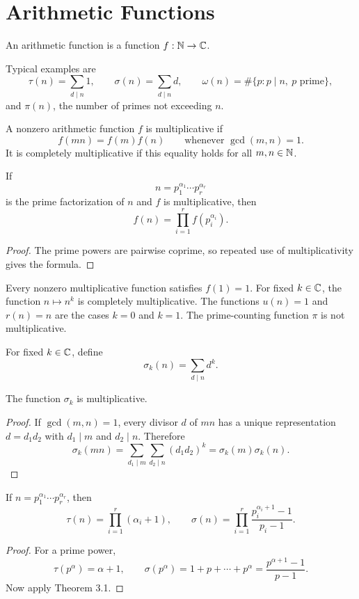 \chapter{Arithmetic Functions}

\begin{de}
An arithmetic function is a function $f:\mathbb{N}\to\mathbb{C}$.
\end{de}
Typical examples are
\[
 \tau(n)=\sum_{d\mid n}1,
 \qquad
 \sigma(n)=\sum_{d\mid n}d,
 \qquad
 \omega(n)=\#\{p:p\mid n,\ p\text{ prime}\},
\]
and $\pi(n)$, the number of primes not exceeding $n$.

\begin{de}
A nonzero arithmetic function $f$ is multiplicative if
\[
 f(mn)=f(m)f(n)\qquad\text{whenever }\gcd(m,n)=1.
\]
It is completely multiplicative if this equality holds for all $m,n\in\mathbb{N}$.
\end{de}

\begin{thm}
If
\[
 n=p_1^{\alpha_1}\cdots p_r^{\alpha_r}
\]
is the prime factorization of $n$ and $f$ is multiplicative, then
\[
 f(n)=\prod_{i=1}^r f(p_i^{\alpha_i}).
\]
\end{thm}
\begin{proof}
The prime powers are pairwise coprime, so repeated use of multiplicativity gives the formula.
\end{proof}

\begin{remark}
Every nonzero multiplicative function satisfies $f(1)=1$.  For fixed $k\in\mathbb{C}$, the function $n\mapsto n^k$ is completely multiplicative.  The functions $u(n)=1$ and $r(n)=n$ are the cases $k=0$ and $k=1$.  The prime-counting function $\pi$ is not multiplicative.
\end{remark}

For fixed $k\in\mathbb{C}$, define
\[
 \sigma_k(n)=\sum_{d\mid n}d^k.
\]

\begin{prop}
The function $\sigma_k$ is multiplicative.
\end{prop}
\begin{proof}
If $\gcd(m,n)=1$, every divisor $d$ of $mn$ has a unique representation $d=d_1d_2$ with $d_1\mid m$ and $d_2\mid n$.  Therefore
\[
 \sigma_k(mn)
 =\sum_{d_1\mid m}\sum_{d_2\mid n}(d_1d_2)^k
 =\sigma_k(m)\sigma_k(n).
\]
\end{proof}

\begin{thm}
If $n=p_1^{\alpha_1}\cdots p_r^{\alpha_r}$, then
\[
 \tau(n)=\prod_{i=1}^r(\alpha_i+1),
 \qquad
 \sigma(n)=\prod_{i=1}^r\frac{p_i^{\alpha_i+1}-1}{p_i-1}.
\]
\end{thm}
\begin{proof}
For a prime power,
\[
 \tau(p^\alpha)=\alpha+1,
 \qquad
 \sigma(p^\alpha)=1+p+\cdots+p^\alpha
 =\frac{p^{\alpha+1}-1}{p-1}.
\]
Now apply Theorem 3.1.
\end{proof}

